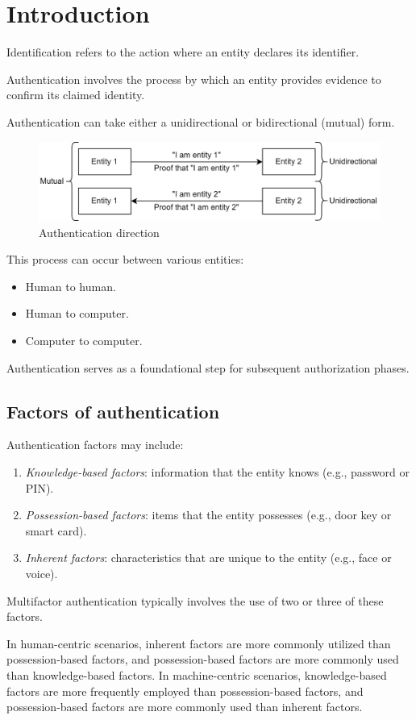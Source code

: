 \section{Introduction}

\begin{definition}
    Identification refers to the action where an entity declares its identifier.
\end{definition}
\begin{definition}
    Authentication involves the process by which an entity provides evidence to confirm its claimed identity.
\end{definition}
Authentication can take either a unidirectional or bidirectional (mutual) form.
\begin{figure}[H]
    \centering
    \includegraphics[width=0.75\linewidth]{images/auth.png}
    \caption{Authentication direction}
\end{figure}
This process can occur between various entities:
\begin{itemize}
    \item Human to human.
    \item Human to computer.
    \item Computer to computer.
\end{itemize}
Authentication serves as a foundational step for subsequent authorization phases.

\subsection{Factors of authentication}
Authentication factors may include:
\begin{enumerate}
    \item \textit{Knowledge-based factors}: information that the entity knows (e.g., password or PIN).
    \item \textit{Possession-based factors}: items that the entity possesses (e.g., door key or smart card).
    \item \textit{Inherent factors}: characteristics that are unique to the entity (e.g., face or voice).
\end{enumerate}
Multifactor authentication typically involves the use of two or three of these factors.

In human-centric scenarios, inherent factors are more commonly utilized than possession-based factors, and possession-based factors are more commonly used than knowledge-based factors.
In machine-centric scenarios, knowledge-based factors are more frequently employed than possession-based factors, and possession-based factors are more commonly used than inherent factors.